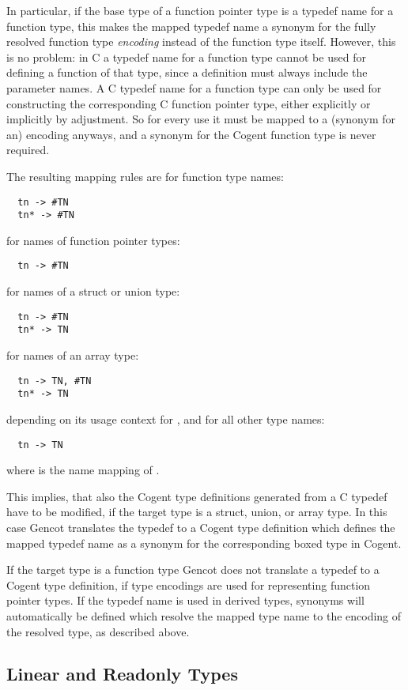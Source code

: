 In particular, if the base type of a function pointer type is a typedef name for a function type, this makes the mapped
typedef name a synonym for the fully resolved function type \textit{encoding} instead of the function type itself.
However, this is no problem: in C a typedef name for a function type cannot be used for defining a function of that type, 
since a definition must always include the parameter names. A C typedef name for a function type can only be used
for constructing the corresponding C function pointer type, either explicitly or implicitly by adjustment. So for
every use it must be mapped to a (synonym for an) encoding anyways, and a synonym for the Cogent function type is never 
required.

The resulting mapping rules are for function type names:
\begin{verbatim}
  tn -> #TN
  tn* -> #TN
\end{verbatim}
for names of function pointer types:
\begin{verbatim}
  tn -> #TN
\end{verbatim}
for names of a struct or union type:
\begin{verbatim}
  tn -> #TN
  tn* -> TN
\end{verbatim}
for names of an array type:
\begin{verbatim}
  tn -> TN, #TN
  tn* -> TN
\end{verbatim}
depending on its usage context for , 
and for all other type names:
\begin{verbatim}
  tn -> TN
\end{verbatim}
where  is the name mapping of .

This implies, that also the Cogent type definitions generated from a C typedef have to be modified, if
the target type is a struct, union, or array type. In this case Gencot translates the typedef 
to a Cogent type definition which defines the mapped typedef name as a synonym 
for the corresponding boxed type in Cogent.

If the target type is a function type Gencot does not translate a typedef to a Cogent type definition, if
type encodings are used for representing function pointer types.
If the typedef name is used in derived types, synonyms will automatically be defined which resolve the 
mapped type name to the encoding of the resolved type, as described above.

\subsection{Linear and Readonly Types}
\label{design-types-readonly}

